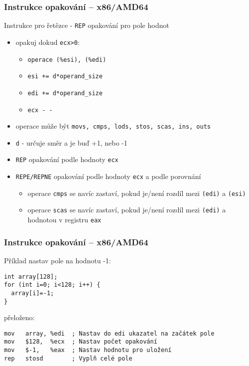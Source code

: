 \documentclass{beamer}
\begin{document}
\begin{frame}
\frametitle{Instrukce opakování – x86/AMD64}
Instrukce pro řetězce  - \texttt{REP} opakování pro pole hodnot
\begin{itemize}
\item opakuj dokud \texttt{ecx>0}:
\begin{itemize}
\item \texttt{operace (\%esi), (\%edi)}
\item \texttt{esi += d*operand\_size}
\item \texttt{edi += d*operand\_size}
\item \texttt{ecx - -}
\end{itemize}
\item operace může být \texttt{movs, cmps, lods, stos, scas, ins, outs}
\item \texttt{d} - určuje směr a je buď +1, nebo -1
\item \texttt{REP} opakování podle hodnoty \texttt{ecx}
\item \texttt{REPE/REPNE} opakování podle hodnoty \texttt{ecx} a podle porovnání
  \begin{itemize}
  \item operace \texttt{cmps} se navíc zastaví, pokud je/není rozdíl mezi \texttt{(edi)} a \texttt{(esi)} 
  \item operace \texttt{scas} se navíc zastaví, pokud je/není rozdíl mezi \texttt{(edi)} a hodnotou v registru \texttt{eax} 
  \end{itemize}
\end{itemize}

\end{frame}


\begin{frame}[fragile]
\frametitle{Instrukce opakování – x86/AMD64}
Příklad nastav pole na hodnotu -1:
\begin{verbatim}
int array[128];
for (int i=0; i<128; i++) {
  array[i]=-1;
}
\end{verbatim}
přeloženo:
\begin{verbatim}
mov   array, %edi  ; Nastav do edi ukazatel na začátek pole
mov   $128,  %ecx  ; Nastav počet opakování
mov   $-1,   %eax  ; Nastav hodnotu pro uložení
rep   stosd        ; Vyplň celé pole
\end{verbatim}
\end{frame}
\end{document}
